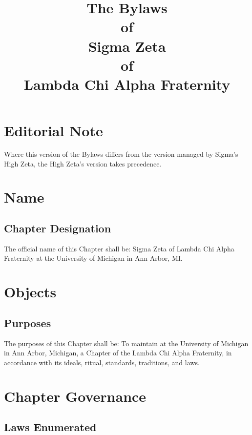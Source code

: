 \documentclass{article}
\title{\addfontfeature{Letters=SmallCaps}%
  The Bylaws\\of\\Sigma Zeta\\of\\Lambda Chi Alpha Fraternity%
}
\date{}
\begin{document}
\maketitle

\section*{Editorial Note}

Where this version of the Bylaws differs from the version managed by Sigma’s
High Zeta, the High Zeta’s version takes precedence.

\section{Name}
\subsection{Chapter Designation}

The official name of this Chapter shall be: Sigma Zeta of Lambda Chi Alpha
Fraternity at the University of Michigan in Ann Arbor, MI.

\section{Objects}
\subsection{Purposes}

The purposes of this Chapter shall be: To maintain at the University of Michigan
in Ann Arbor, Michigan, a Chapter of the Lambda Chi Alpha Fraternity, in
accordance with its ideals, ritual, standards, traditions, and laws.

\section{Chapter Governance}
\subsection{Laws Enumerated}
\end{document}
